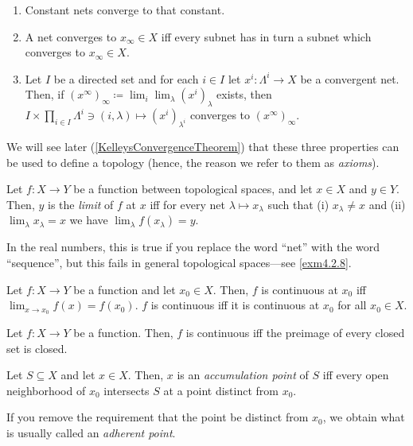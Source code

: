 \begin{thm}\label{KelleysConvergenceAxioms}
\begin{enumerate}
\item \label{enmKelleysConvergenceAxioms.i}Constant nets converge to that constant.
\item \label{enmKelleysConvergenceAxioms.ii}A net converges to $x_\infty \in X$ iff every subnet has in turn a subnet which converges to $x_\infty \in X$.
\item \label{enmKelleysConvergenceAxioms.iii}Let $I$ be a directed set and for each $i\in I$ let $x^i:\Lambda ^i\rightarrow X$ be a convergent net.  Then, if $(x^\infty )_\infty \coloneqq \lim _i\lim _\lambda (x^i)_\lambda$ exists, then $I\times \prod _{i\in I}\Lambda ^i\ni (i,\lambda )\mapsto (x^i)_{\lambda ^i}$ converges to $(x^\infty )_\infty$.
\end{enumerate}
\begin{rmk}
We will see later (\cref{KelleysConvergenceTheorem}) that these three properties can be used to define a topology (hence, the reason we refer to them as \emph{axioms}).
\end{rmk}
\end{thm}
\begin{dfn}\label{dfnLimitOfAFunction}
Let $f:X \rightarrow Y$ be a function between topological spaces, and let $x\in X$ and $y\in Y$.  Then, $y$ is the \emph{limit} of $f$ at $x$ iff for every net $\lambda \mapsto x_\lambda$ such that (i) $x_\lambda \neq x$ and (ii) $\lim _\lambda x_\lambda =x$ we have $\lim _\lambda f(x_\lambda )=y$.
\begin{rmk}
In the real numbers, this is true if you replace the word ``net'' with the word ``sequence'', but this fails in general topological spaces---see \cref{exm4.2.8}.
\end{rmk}
\end{dfn}
\begin{prp}
Let $f:X\rightarrow Y$ be a function and let $x_0\in X$.  Then, $f$ is continuous at $x_0$ iff $\lim _{x\to x_0}f(x)=f(x_0)$.  $f$ is continuous iff it is continuous at $x_0$ for all $x_0\in X$.
\end{prp}
\begin{prp}
Let $f:X\rightarrow Y$ be a function.  Then, $f$ is continuous iff the preimage of every closed set is closed.
\end{prp}
\begin{dfn}
Let $S\subseteq X$ and let $x\in X$.  Then, $x$ is an \emph{accumulation point} of $S$ iff every open neighborhood of $x_0$ intersects $S$ at a point distinct from $x_0$.
\begin{rmk}
If you remove the requirement that the point be distinct from $x_0$, we obtain what is usually called an \emph{adherent point}.
\end{rmk}
\end{dfn}
